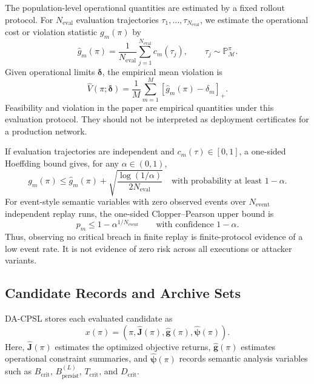 \documentclass[sigconf,review,anonymous]{acmart}
\begin{document}
The population-level operational quantities are estimated by a fixed
rollout protocol. For \(N_{\mathrm{eval}}\) evaluation trajectories
\(\tau_1,\ldots,\tau_{N_{\mathrm{eval}}}\), we estimate the operational
cost or violation statistic \(g_m(\pi)\) by
\begin{equation}
 \widehat{g}_m(\pi)
 =
 \frac{1}{N_{\mathrm{eval}}}
 \sum_{j=1}^{N_{\mathrm{eval}}}
 c_m(\tau_j),
 \qquad
 \tau_j\sim\mathbb{P}_{\mathcal{M}}^\pi .
 \label{eq:app-empirical-g}
\end{equation}
Given operational limits \(\boldsymbol{\delta}\), the empirical mean
violation is
\begin{equation}
 \widehat{V}(\pi;\boldsymbol{\delta})
 =
 \frac{1}{M}
 \sum_{m=1}^{M}
 \left[\widehat{g}_m(\pi)-\delta_m\right]_+ .
 \label{eq:app-empirical-violation}
\end{equation}
Feasibility and violation in the paper are empirical quantities under
this evaluation protocol. They should not be interpreted as deployment
certificates for a production network.

If evaluation trajectories are independent and \(c_m(\tau)\in[0,1]\), a
one-sided Hoeffding bound gives, for any \(\alpha\in(0,1)\),
\begin{equation}
 g_m(\pi)
 \leq
 \widehat{g}_m(\pi)
 +
 \sqrt{\frac{\log(1/\alpha)}{2N_{\mathrm{eval}}}}
 \quad
 \text{with probability at least }1-\alpha .
 \label{eq:app-hoeffding}
\end{equation}
For event-style semantic variables with zero observed events over
\(N_{\mathrm{event}}\) independent replay runs, the one-sided
Clopper--Pearson upper bound is
\begin{equation}
 p_m
 \leq
 1-\alpha^{1/N_{\mathrm{event}}}
 \qquad
 \text{with confidence }1-\alpha .
 \label{eq:app-zero-event-bound}
\end{equation}
Thus, observing no critical breach in finite replay is finite-protocol
evidence of a low event rate. It is not evidence of zero risk across all
executions or attacker variants.

\subsection{Candidate Records and Archive Sets}
\label{app:candidate-records}

DA-CPSL stores each evaluated candidate as
\begin{equation}
 x(\pi)
 =
 \left(
 \pi,
 \widehat{\mathbf{J}}(\pi),
 \widehat{\mathbf{g}}(\pi),
 \widehat{\boldsymbol{\psi}}(\pi)
 \right).
 \label{eq:app-candidate-record}
\end{equation}
Here, \(\widehat{\mathbf{J}}(\pi)\) estimates the optimized objective
returns, \(\widehat{\mathbf{g}}(\pi)\) estimates operational constraint
summaries, and \(\widehat{\boldsymbol{\psi}}(\pi)\) records semantic
analysis variables such as \(B_{\mathrm{crit}}\),
\(B_{\mathrm{persist}}^{(L)}\), \(T_{\mathrm{crit}}\), and
\(D_{\mathrm{crit}}\).
\end{document}
